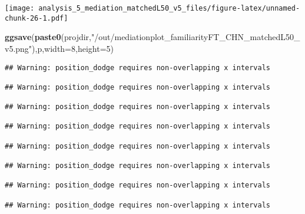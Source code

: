 \documentclass[
]{article}
\newenvironment{Shaded}{\begin{snugshade}}{\end{snugshade}}
\newcommand{\DataTypeTok}[1]{\textcolor[rgb]{0.13,0.29,0.53}{#1}}
\newcommand{\DecValTok}[1]{\textcolor[rgb]{0.00,0.00,0.81}{#1}}
\newcommand{\KeywordTok}[1]{\textcolor[rgb]{0.13,0.29,0.53}{\textbf{#1}}}
\newcommand{\NormalTok}[1]{#1}
\newcommand{\StringTok}[1]{\textcolor[rgb]{0.31,0.60,0.02}{#1}}
\begin{document}
\texttt{[image: analysis\_5\_mediation\_matchedL50\_v5\_files/figure-latex/unnamed-chunk-26-1.pdf]}

\begin{Shaded}
\begin{Highlighting}[]
\KeywordTok{ggsave}\NormalTok{(}\KeywordTok{paste0}\NormalTok{(projdir,}\StringTok{"/out/mediationplot_familiarityFT_CHN_matchedL50_v5.png"}\NormalTok{),p,}\DataTypeTok{width=}\DecValTok{8}\NormalTok{,}\DataTypeTok{height=}\DecValTok{5}\NormalTok{)}
\end{Highlighting}
\end{Shaded}

\begin{verbatim}
## Warning: position_dodge requires non-overlapping x intervals

## Warning: position_dodge requires non-overlapping x intervals

## Warning: position_dodge requires non-overlapping x intervals

## Warning: position_dodge requires non-overlapping x intervals

## Warning: position_dodge requires non-overlapping x intervals

## Warning: position_dodge requires non-overlapping x intervals

## Warning: position_dodge requires non-overlapping x intervals

## Warning: position_dodge requires non-overlapping x intervals
\end{verbatim}
\end{document}
